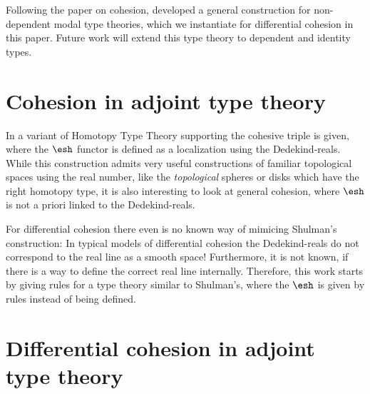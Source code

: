 \documentclass{article}
\begin{document}
Following the \citeyear{Licata2016} paper on cohesion, \citet{Licata2017}
developed a general construction for non-dependent modal type theories, which we
instantiate for differential cohesion in this paper. Future work will extend
this type theory to dependent and identity types.

\section{Cohesion in adjoint type theory}

In \citet{Shulman2015} a variant of Homotopy Type Theory supporting the cohesive triple is given,
where the $\shape$ functor is defined as a localization using the Dedekind-reals. 
While this construction admits very useful constructions of familiar topological spaces using the real number, 
like the \emph{topological} spheres or disks which have the right homotopy type, 
it is also interesting to look at general cohesion, where $\shape$ is not a priori linked to the Dedekind-reals.

For differential cohesion there even is no known way of mimicing Shulman's construction:
In typical models of differential cohesion the Dedekind-reals do not correspond to the real line as a smooth space!
Furthermore, it is not known, if there is a way to define the correct real line internally.
Therefore, this work starts by giving rules for a type theory similar to Shulman's, 
where the $\shape$ is given by rules instead of being defined.

\section{Differential cohesion in adjoint type theory}





\end{document}
